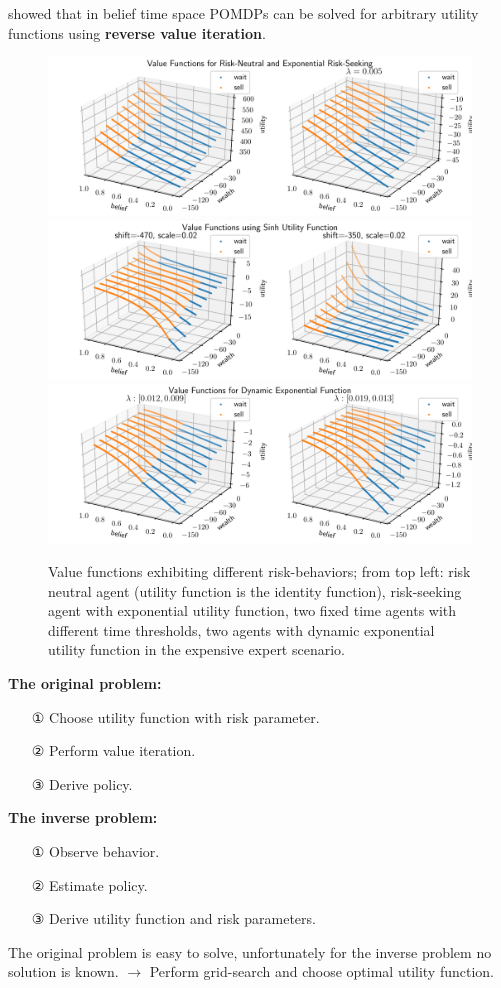 \cite{marecki} showed that in belief time space POMDPs can be solved for arbitrary utility functions using \textbf{reverse value iteration}.

\begin{figure}
    \includegraphics[width=0.9\linewidth]{img/exp_policy.pdf}\\
    \includegraphics[width=0.9\linewidth]{img/sinh_policy.pdf}\\
    \includegraphics[width=0.9\linewidth]{img/dyn_policy.pdf}
    \caption{Value functions exhibiting different risk-behaviors; from top left: risk neutral agent (utility function is the identity function), risk-seeking agent with exponential utility function, two fixed time agents with different time thresholds, two agents with dynamic exponential utility function in the expensive expert scenario.}
\end{figure}

\textbf{The original problem:}
\begin{itemize}
\item[①] Choose utility function with risk parameter.
\item[②] Perform value iteration.
\item[③] Derive policy.
\end{itemize}

\textbf{The inverse problem:}
\begin{itemize}
\item[①] Observe behavior.
\item[②] Estimate policy.
\item[③] Derive utility function and risk parameters.
\end{itemize}

The original problem is easy to solve, unfortunately for the inverse problem no solution is known. $\rightarrow$ Perform grid-search and choose optimal utility function.
